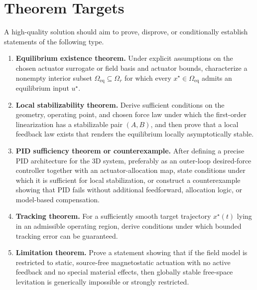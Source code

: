 \documentclass[11pt]{article}
\begin{document}
\section{Theorem Targets}
A high-quality solution should aim to prove, disprove, or conditionally establish statements of the following type.

\begin{enumerate}[label=\textbf{T\arabic*:}, leftmargin=3em]
    \item \textbf{Equilibrium existence theorem.} Under explicit assumptions on the chosen actuator surrogate or field basis and actuator bounds, characterize a nonempty interior subset $\Omega_{\mathrm{eq}}\subseteq\Omega_r$ for which every $x^\star\in\Omega_{\mathrm{eq}}$ admits an equilibrium input $u^\star$.

    \item \textbf{Local stabilizability theorem.} Derive sufficient conditions on the geometry, operating point, and chosen force law under which the first-order linearization has a stabilizable pair $(A,B)$, and then prove that a local feedback law exists that renders the equilibrium locally asymptotically stable.

    \item \textbf{PID sufficiency theorem or counterexample.} After defining a precise PID architecture for the 3D system, preferably as an outer-loop desired-force controller together with an actuator-allocation map, state conditions under which it is sufficient for local stabilization, or construct a counterexample showing that PID fails without additional feedforward, allocation logic, or model-based compensation.

    \item \textbf{Tracking theorem.} For a sufficiently smooth target trajectory $x^\star(t)$ lying in an admissible operating region, derive conditions under which bounded tracking error can be guaranteed.

    \item \textbf{Limitation theorem.} Prove a statement showing that if the field model is restricted to static, source-free magnetostatic actuation with no active feedback and no special material effects, then globally stable free-space levitation is generically impossible or strongly restricted.
\end{enumerate}
\end{document}

